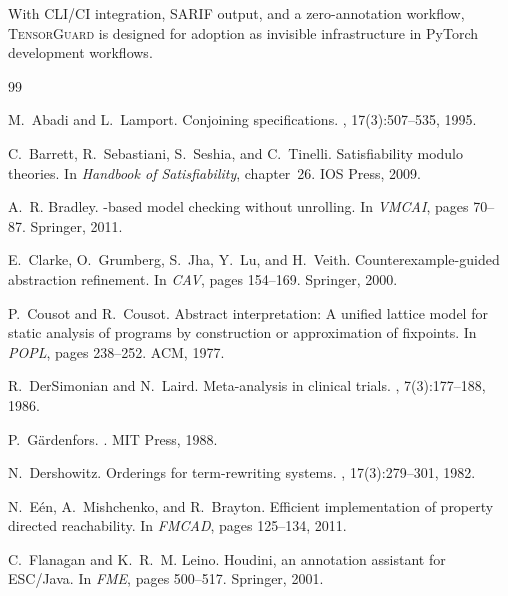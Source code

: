 \documentclass[11pt]{article}
\begin{document}
With CLI/CI integration, SARIF output, and a zero-annotation
workflow, \textsc{TensorGuard} is designed for adoption as invisible
infrastructure in PyTorch development workflows.



\begin{thebibliography}{99}

M.~Abadi and L.~Lamport.
\newblock Conjoining specifications.
, 17(3):507--535, 1995.

C.~Barrett, R.~Sebastiani, S.~Seshia, and C.~Tinelli.
\newblock Satisfiability modulo theories.
\newblock In {\em Handbook of Satisfiability}, chapter~26. IOS Press, 2009.

A.~R. Bradley.
-based model checking without unrolling.
\newblock In {\em VMCAI}, pages 70--87. Springer, 2011.

E.~Clarke, O.~Grumberg, S.~Jha, Y.~Lu, and H.~Veith.
\newblock Counterexample-guided abstraction refinement.
\newblock In {\em CAV}, pages 154--169. Springer, 2000.

P.~Cousot and R.~Cousot.
\newblock Abstract interpretation: A unified lattice model for static analysis
  of programs by construction or approximation of fixpoints.
\newblock In {\em POPL}, pages 238--252. ACM, 1977.

R.~DerSimonian and N.~Laird.
\newblock Meta-analysis in clinical trials.
, 7(3):177--188, 1986.

P.~G{\"a}rdenfors.
.
\newblock MIT Press, 1988.

N.~Dershowitz.
\newblock Orderings for term-rewriting systems.
, 17(3):279--301, 1982.

N.~E{\'e}n, A.~Mishchenko, and R.~Brayton.
\newblock Efficient implementation of property directed reachability.
\newblock In {\em FMCAD}, pages 125--134, 2011.

C.~Flanagan and K.~R.~M. Leino.
\newblock Houdini, an annotation assistant for {ESC/Java}.
\newblock In {\em FME}, pages 500--517. Springer, 2001.


\end{thebibliography}
\end{document}
